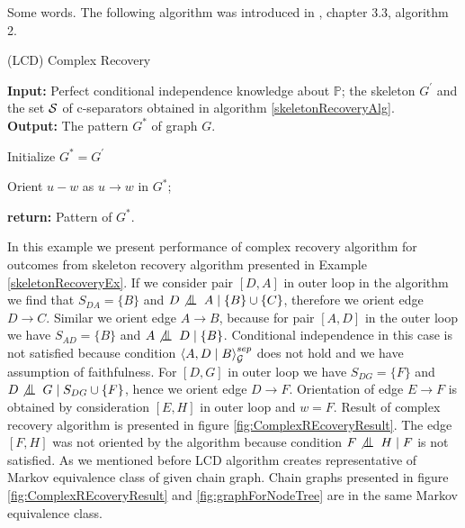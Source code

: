 %
%

Some words. The following algorithm was introduced in \cite{CG}, chapter 3.3, algorithm 2.

\begin{algorithm}
	\caption{(LCD) Complex Recovery}\label{complexRecoveryAlg}
	
	\textbf{Input:} Perfect conditional independence knowledge about $\mathbb{P}$; the skeleton $G^{'}$ and the set 
					$\mathcal{S}$ of c-separators obtained in algorithm \ref{skeletonRecoveryAlg}.  \\
	\textbf{Output:} The pattern $G^{*}$ of graph $G$.

	
	\begin{algorithmic}[1]
			\State Initialize $G^{*} = G^{'}$ 
	
						\State Orient $u - w$ as $u \rightarrow w$ in $G^{*}$;
					\EndIf
				\EndFor
			\EndFor			
			
			\State \textbf{return:} Pattern of $G^{*}$.
		\EndProcedure
	\end{algorithmic}
\end{algorithm}


\begin{ex}
	In this example we present performance of complex recovery algorithm for outcomes from skeleton recovery
	algorithm presented in Example \ref{skeletonRecoveryEx}. If we consider pair $[D, A]$ in outer loop in
	the algorithm we find that $S_{DA} = \{ B \}$ and $D \not \bigCI A \mid \{ B \} \cup \{ C \}$, therefore 
	we orient edge $D \rightarrow C$. Similar we orient edge $A \rightarrow B$, because for pair $[A, D]$ in
	the outer loop we have $S_{AD} = \{ B \}$ and $A \not \bigCI D \mid \{ B \} $. Conditional independence 
	in this case is not satisfied because condition $\left\langle A , D \mid B \right\rangle_{\mathcal{G}}^{sep}$ does not hold and we have assumption
	of faithfulness. For $[D, G]$ in outer loop we have $S_{DG} = \{ F\}$ and 
	$D \not \bigCI G \mid S_{DG} \cup \{ F \}$, hence we orient edge $D \rightarrow F$. Orientation of edge 
	$E \rightarrow F$ is obtained by consideration $[E, H]$ in outer loop and $w = F$. Result of complex
	recovery algorithm is presented in figure \ref{fig:ComplexREcoveryResult}. The edge $[F, H]$ was not oriented
	by the algorithm because condition $F \not\bigCI H \mid F$ is not satisfied. As we mentioned before 
	LCD algorithm creates representative of Markov equivalence class of given chain graph. 
	Chain graphs presented in figure \ref{fig:ComplexREcoveryResult} and \ref{fig:graphForNodeTree} are in the
	same Markov equivalence class.  
\end{ex}


